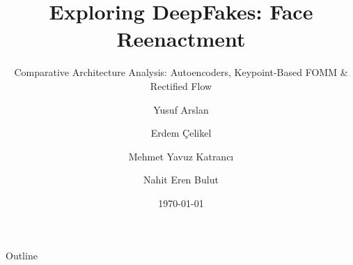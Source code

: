 \documentclass[aspectratio=169,11pt]{beamer}
\title[Face Reenactment]{Exploring DeepFakes: Face Reenactment}
\subtitle{Comparative Architecture Analysis: Autoencoders, Keypoint-Based FOMM \& Rectified Flow}
\author[Arslan et al.]{Yusuf Arslan \and Erdem Çelikel \and Mehmet Yavuz Katrancı \and Nahit Eren Bulut}
\institute[Dept. of Computer Science]{Deep Learning \& Computer Vision}
\date{\today}
\begin{document}
\begin{frame}[plain]
    \titlepage
\end{frame}

\begin{frame}{Outline}
    \tableofcontents[hideallsubsections]
\end{frame}



















% 
% 
% 
\end{document}
